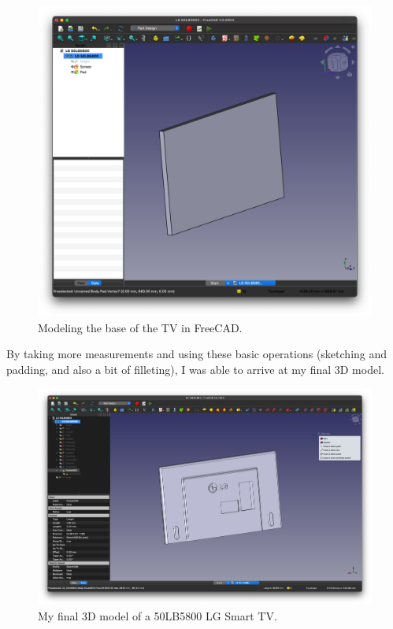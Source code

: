 \documentclass[12pt, letterpaper]{article}
\begin{document}
\begin{figure}[H]
  \medskip
  \centering
  \includegraphics[width=1\linewidth]{a2}
  \caption{Modeling the base of the TV in FreeCAD.}
  \medskip
  \label{fig:a2}
\end{figure}

By taking more measurements and using these basic operations
(sketching and padding, and also a bit of filleting), I was able to
arrive at my final 3D model.

\begin{figure}[H]
  \medskip
  \centering
  \includegraphics[width=1\linewidth]{a3}
  \caption{My final 3D model of a 50LB5800 LG Smart TV.}
  \medskip
  \label{fig:a3}
\end{figure}
\end{document}
